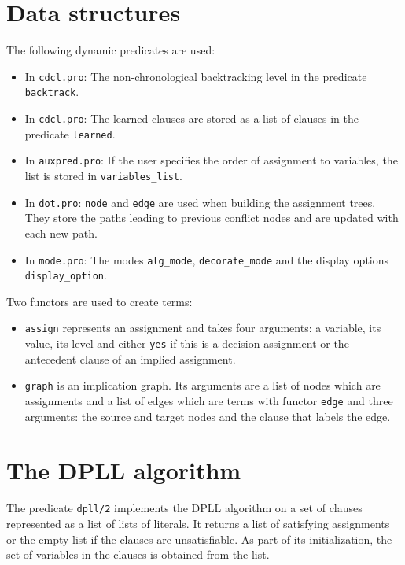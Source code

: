 \documentclass[11pt]{article}
\newcommand*{\p}[1]{\textup{\texttt{#1}}}
\begin{document}
\section{Data structures}

The following dynamic predicates are used:
\begin{itemize}
\item In \p{cdcl.pro}: The non-chronological backtracking level in the
predicate \p{backtrack}.

\item In \p{cdcl.pro}: The learned clauses are stored as a list of
clauses in the predicate \p{learned}.

\item In \p{auxpred.pro}: If the user specifies the order of assignment
to variables, the list is stored in \p{variables\_list}.

\item In \p{dot.pro}: \p{node} and \p{edge} are used when building the
assignment trees. They store the paths leading to previous conflict
nodes and are updated with each new path.

\item In \p{mode.pro}: The modes \p{alg\_mode}, \p{decorate\_mode} and
the display options \p{display\_option}.

\end{itemize}

\newpage

Two functors are used to create terms:
\begin{itemize}

\item \p{assign} represents an assignment and takes four arguments: a
variable, its value, its level and either \p{yes} if this is a decision
assignment or the antecedent clause of an implied assignment.

\item \p{graph} is an implication graph. Its arguments are a list of
nodes which are assignments and a list of edges which are terms with
functor \p{edge} and three arguments: the source and target nodes
and the clause that labels the edge.
\end{itemize}


\section{The DPLL algorithm}

The predicate \p{dpll/2} implements the DPLL algorithm on a set of
clauses represented as a list of lists of literals. It returns a list of
satisfying assignments or the empty list if the clauses are
unsatisfiable. As part of its initialization, the set of variables in
the clauses is obtained from the list.
\end{document}
